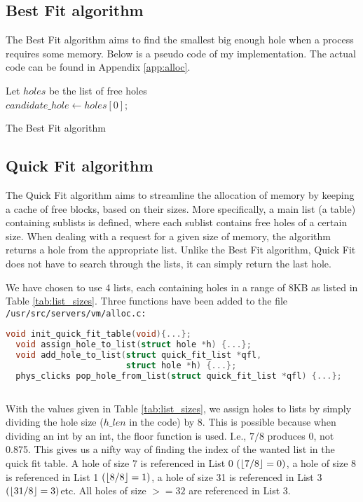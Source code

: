 \documentclass[11pt]{article}
\DeclarePairedDelimiter{\floor}{\lfloor}{\rfloor}
\begin{document}
\subsection{Best Fit algorithm}
The Best Fit algorithm aims to find the smallest big enough hole when a process requires some memory. Below is a pseudo code of my implementation. The actual code can be found in Appendix \ref{app:alloc}.\\

\begin{algorithm}[H]
	Let $holes$ be the list of free holes\\
	$candidate\_hole \leftarrow holes[0]$;\\
	\caption{The Best Fit algorithm}
\end{algorithm}

\subsection{Quick Fit algorithm}
The Quick Fit algorithm aims to streamline the allocation of memory by keeping a cache of free blocks, based on their sizes. More specifically, a main list (a table) containing sublists is defined, where each sublist contains free holes of a certain size. When dealing with a request for a given size of memory, the algorithm returns a hole from the appropriate list. Unlike the Best Fit algorithm, Quick Fit does not have to search through the lists, it can simply return the last hole.

We have chosen to use 4 lists, each containing holes in a range of 8KB as listed in Table \ref{tab:list_sizes}. Three functions have been added to the file\\
\tt /usr/src/servers/vm/alloc.c\normalfont:

\begin{lstlisting}[language=c]
  void init_quick_fit_table(void){...};
  void assign_hole_to_list(struct hole *h) {...};
  void add_hole_to_list(struct quick_fit_list *qfl,
                        struct hole *h) {...};
  phys_clicks pop_hole_from_list(struct quick_fit_list *qfl) {...};
  
\end{lstlisting}
With the values given in Table \ref{tab:list_sizes}, we assign holes to lists by simply dividing the hole size ($h\_len$ in the code) by 8. This is possible because when dividing an int by an int, the floor function is used. I.e., $7/8$ produces 0, not 0.875. This gives us a nifty way of finding the index of the wanted list in the quick fit table. A hole of size 7 is referenced in List 0 $(\floor{7/8}=0)$, a hole of size 8 is referenced in List 1 $(\floor{8/8}=1)$, a hole of size 31 is referenced in List 3 $(\floor{31/8}=3)$etc. All holes of size $>=32$ are referenced in List 3.
\end{document}
